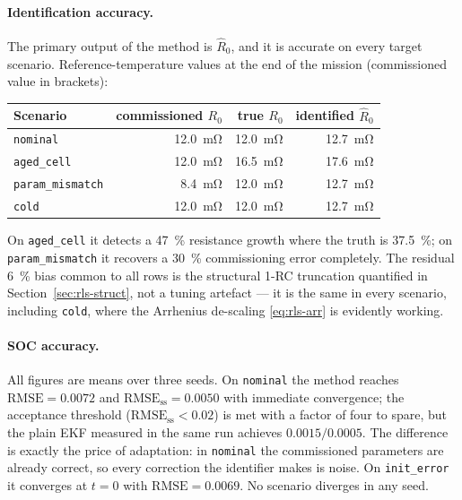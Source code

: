 \paragraph{Identification accuracy.}  The primary output of the method is $\hat R_0$, and it is
accurate on every target scenario.  Reference-temperature values at the end of the mission
(commissioned value in brackets):
\begin{center}
\begin{tabular}{@{}lrrr@{}}
\toprule
Scenario & commissioned $R_0$ & true $R_0$ & identified $\hat R_0$\\
\midrule
\texttt{nominal}        & \SI{12.0}{\milli\ohm} & \SI{12.0}{\milli\ohm} & \SI{12.7}{\milli\ohm}\\
\texttt{aged\_cell}     & \SI{12.0}{\milli\ohm} & \SI{16.5}{\milli\ohm} & \SI{17.6}{\milli\ohm}\\
\texttt{param\_mismatch}& \SI{8.4}{\milli\ohm}  & \SI{12.0}{\milli\ohm} & \SI{12.7}{\milli\ohm}\\
\texttt{cold}           & \SI{12.0}{\milli\ohm} & \SI{12.0}{\milli\ohm} & \SI{12.7}{\milli\ohm}\\
\bottomrule
\end{tabular}
\end{center}
On \texttt{aged\_cell} it detects a \SI{+47}{\percent} resistance growth where the truth is
\SI{+37.5}{\percent}; on \texttt{param\_mismatch} it recovers a \SI{30}{\percent} commissioning
error completely.  The residual \SI{+6}{\percent} bias common to all rows is the structural 1-RC
truncation quantified in Section~\ref{sec:rls-struct}, not a tuning artefact --- it is the same in
every scenario, including \texttt{cold}, where the Arrhenius de-scaling \eqref{eq:rls-arr} is
evidently working.

\paragraph{SOC accuracy.}  All figures are means over three seeds.  On \texttt{nominal} the method
reaches $\text{RMSE}=0.0072$ and $\text{RMSE}_\text{ss}=0.0050$ with immediate convergence; the
acceptance threshold ($\text{RMSE}_\text{ss}<0.02$) is met with a factor of four to spare, but the
plain EKF measured in the same run achieves $0.0015/0.0005$.  The difference is exactly the price of adaptation: in
\texttt{nominal} the commissioned parameters are already correct, so every correction the identifier
makes is noise.  On \texttt{init\_error} it converges at $t=0$ with $\text{RMSE}=0.0069$.  No scenario diverges in
any seed.

